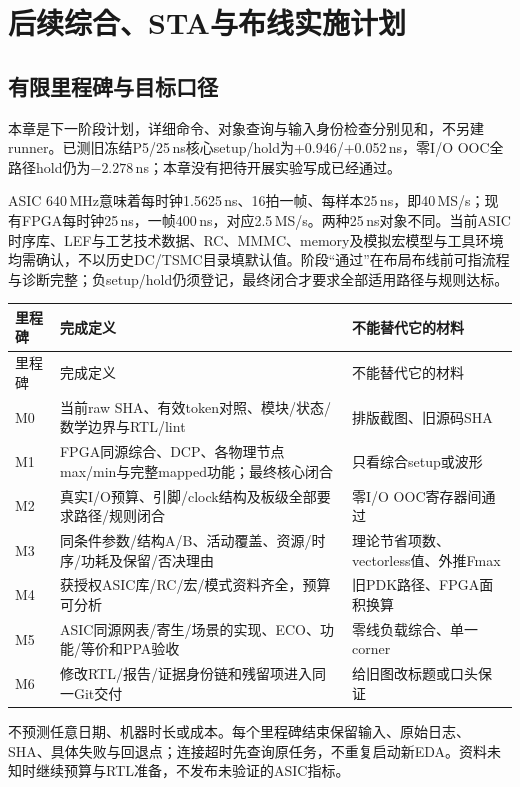 \chapter{后续综合、STA与布线实施计划}
\label{chap:implementation-plan}
\section{有限里程碑与目标口径}
本章是下一阶段计划，详细命令、对象查询与输入身份检查分别见和，不另建runner。已测旧冻结P5/25\,ns核心setup/hold为+0.946/+0.052\,ns，零I/O OOC全路径hold仍为$-2.278$\,ns；本章没有把待开展实验写成已经通过。

ASIC 640\,MHz意味着每时钟1.5625\,ns、16拍一帧、每样本25\,ns，即40\,MS/s；现有FPGA每时钟25\,ns，一帧400\,ns，对应2.5\,MS/s。两种25\,ns对象不同。当前ASIC时序库、LEF与工艺技术数据、RC、MMMC、memory及模拟宏模型与工具环境均需确认，不以历史DC/TSMC目录填默认值。阶段“通过”在布局布线前可指流程与诊断完整；负setup/hold仍须登记，最终闭合才要求全部适用路径与规则达标。

\begingroup\small\setlength{\tabcolsep}{3pt}
\begin{longtable}{p{13mm}p{65mm}p{75mm}}
\toprule 里程碑&完成定义&不能替代它的材料\\\midrule\endfirsthead
\toprule 里程碑&完成定义&不能替代它的材料\\\midrule\endhead
M0&当前raw SHA、有效token对照、模块/状态/数学边界与RTL/lint&排版截图、旧源码SHA\\
M1&FPGA同源综合、DCP、各物理节点max/min与完整mapped功能；最终核心闭合&只看综合setup或波形\\
M2&真实I/O预算、引脚/clock结构及板级全部要求路径/规则闭合&零I/O OOC寄存器间通过\\
M3&同条件参数/结构A/B、活动覆盖、资源/时序/功耗及保留/否决理由&理论节省项数、vectorless值、外推Fmax\\
M4&获授权ASIC库/RC/宏/模式资料齐全，预算可分析&旧PDK路径、FPGA面积换算\\
M5&ASIC同源网表/寄生/场景的实现、ECO、功能/等价和PPA验收&零线负载综合、单一corner\\
M6&修改RTL/报告/证据身份链和残留项进入同一Git交付&给旧图改标题或口头保证\\
\bottomrule\end{longtable}\endgroup
不预测任意日期、机器时长或成本。每个里程碑结束保留输入、原始日志、SHA、具体失败与回退点；连接超时先查询原任务，不重复启动新EDA。资料未知时继续预算与RTL准备，不发布未验证的ASIC指标。

